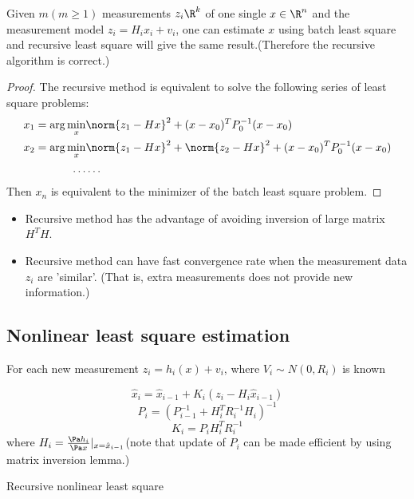 \begin{refsection}
\begin{lemma}\cite[160]{bertsekas2016nonlinear}
	Given $m(m\geq 1)$ measurements $z_i\R^k$ of one single $x\in \R^n$ and the measurement model $z_i = H_ix_i + v_i$, one can estimate $x$ using batch least square and recursive least square will give the same result.(Therefore the recursive algorithm is correct.)
\end{lemma}
\begin{proof}
The recursive method is equivalent to solve the following series of least square problems:
\begin{align*}
x_1 = \arg \min_x & \norm{z_1 - Hx}^2 + (x - x_0)^TP_0^{-1}(x - x_0) \\
x_2 = \arg \min_x & \norm{z_1 - Hx}^2 + \norm{z_2 - Hx}^2+ (x - x_0)^TP_0^{-1}(x - x_0) \\
\dots & \dots \\
\end{align*}
Then $x_n$ is equivalent to the minimizer of the batch least square problem.
\end{proof}

\begin{remark}\hfill
	\begin{itemize}
		\item Recursive method has the advantage of avoiding inversion of large matrix $H^TH$. 
		\item Recursive method can have fast convergence rate when the measurement data $z_i$ are 'similar'. (That is, extra measurements does not provide new information.)
	\end{itemize}
\end{remark}




\subsection{Nonlinear least square estimation}


\begin{algorithm}[H]
	\SetAlgoLined
	For each new measurement $z_i = h_i(x) + v_i$, where $V_i\sim N(0,R_i)$ is known
	
	$$\hat{x}_i = \hat{x}_{i-1} + K_i(z_i - H_i\hat{x}_{i-1})$$
	$$P_i = (P_{i-1}^{-1} + H_i^TR_i^{-1}H_i)^{-1}$$
	$$K_i = P_iH_i^TR_i^{-1}$$
	where $H_i = \frac{\Pa h_i}{\Pa x}|_{x=\hat{x}_{i-1}}$(note that update of $P_i$ can be made efficient by using matrix inversion lemma.)\\
	\caption{Recursive nonlinear least square}
\end{algorithm}


\end{refsection}

